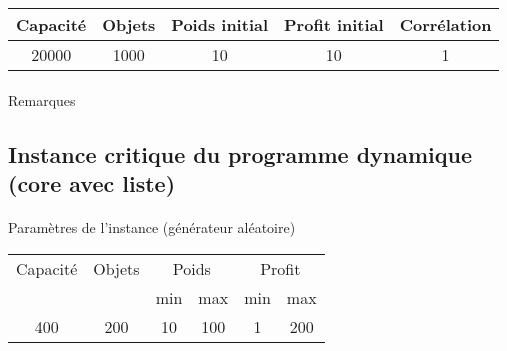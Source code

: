 \documentclass[12pt]{article}
\begin{document}
\begin{tabular}{|c|c|c|c|c|}
	\hline
	Capacité & Objets & Poids initial & Profit initial & Corrélation \\
	\hline
	20000 & 1000 & 10 & 10 & 1 \\
	\hline
\end{tabular}

\begin{figure}[!h]
\begin{floatrow}
\end{floatrow}
\end{figure}

\paragraph{}Remarques

\subsection{Instance critique du programme dynamique (core avec liste)}

\paragraph{}Paramètres de l'instance (générateur aléatoire)

\begin{tabular}{|c|c|c|c|c|c|}
	\hline
	Capacité & Objets & \multicolumn{2}{c|}{Poids} & \multicolumn{2}{c|}{Profit} \\
	\cline{3-6}
		& & min & max & min & max \\
	\hline
	400 & 200 & 10 & 100 & 1 & 200 \\
	\hline
\end{tabular}
\end{document}
